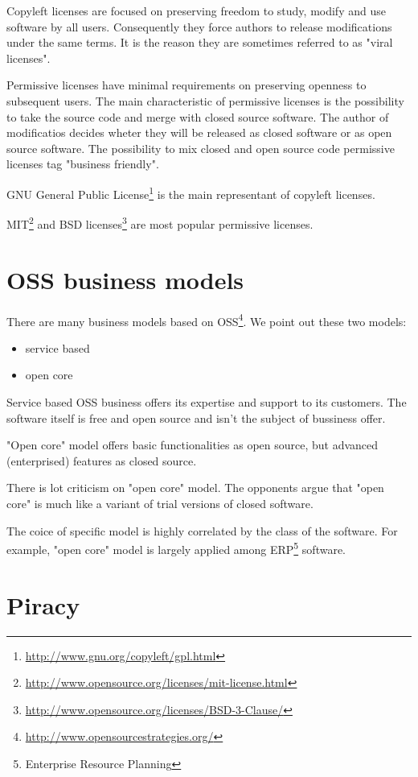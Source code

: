 \documentclass[times, utf8, seminar]{fit}
\begin{document}
Copyleft licenses are focused on preserving freedom to study, modify and use software by all users. Consequently they force authors to release modifications under the same terms. It is the reason they are sometimes referred to as "viral licenses".

Permissive licenses have minimal requirements on preserving openness to subsequent users. The main characteristic of permissive licenses is the possibility to take the source code and merge with closed source software. The author of modificatios decides wheter they will be released as closed software or as open source software. The possibility to mix closed and open source code permissive licenses tag "business friendly".

GNU General Public License\footnote{\url{http://www.gnu.org/copyleft/gpl.html}} is the main representant of copyleft licenses.

MIT\footnote{\url{http://www.opensource.org/licenses/mit-license.html}} and BSD licenses\footnote{\url{http://www.opensource.org/licenses/BSD-3-Clause/}} are most popular permissive licenses.

\section{OSS business models}

There are many business models based on OSS\footnote{\url{http://www.opensourcestrategies.org/}}. We point out these two models: 
\begin{itemize}
  \item service based
  \item open core 
\end{itemize}


Service based OSS business offers its expertise and support to its customers. The software itself is free and open source and isn't the subject of bussiness offer.

"Open core" model offers basic functionalities as open source, but advanced (enterprised) features as closed source.

There is lot criticism on "open core" model. The opponents argue that "open core" is much like a variant of trial versions of closed software.

The coice of specific model is highly correlated by the class of the software.  For example, "open core" model is largely applied among ERP\footnote{Enterprise Resource Planning} software.  

\section{Piracy}
\end{document}
